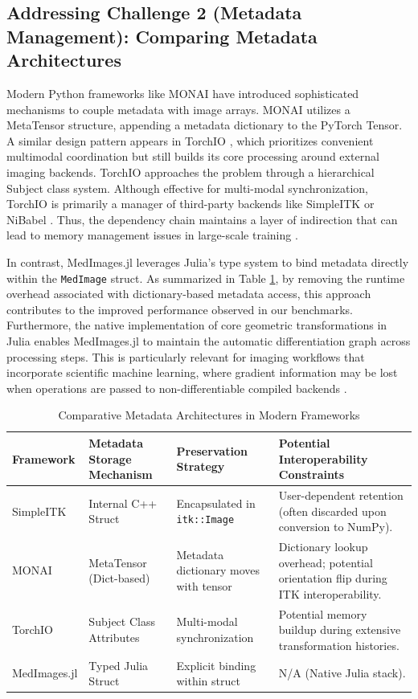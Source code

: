 \documentclass[10pt,letterpaper]{article}
\begin{document}
\subsection*{Addressing Challenge 2 (Metadata Management): Comparing Metadata Architectures}
Modern Python frameworks like MONAI \cite{CardosoLi2022} have introduced sophisticated mechanisms to couple metadata with image arrays. MONAI utilizes a MetaTensor structure, appending a metadata dictionary to the PyTorch Tensor. A similar design pattern appears in TorchIO \cite{perezgarcia2021torchio}, which prioritizes convenient multimodal coordination but still builds its core processing around external imaging backends. TorchIO approaches the problem through a hierarchical Subject class system. Although effective for multi-modal synchronization, TorchIO is primarily a manager of third-party backends  like SimpleITK or NiBabel \cite{perezgarcia2021torchio}. Thus, the dependency chain maintains a layer of indirection that can lead to memory management issues in large-scale training \cite{perezgarcia2021torchio}.

In contrast, MedImages.jl leverages Julia's type system to bind metadata directly within the \texttt{MedImage} struct. As summarized in Table \ref{tab:metadata_comparison}, by removing the runtime overhead associated with dictionary-based metadata access, this approach contributes to the improved performance observed in our benchmarks. Furthermore, the native implementation of core geometric transformations in Julia enables MedImages.jl to maintain the automatic differentiation graph across processing steps. This is particularly relevant for imaging workflows that incorporate scientific machine learning, where gradient information may be lost when operations are passed to non-differentiable compiled backends \cite{perezgarcia2021torchio}. 

\begin{table}[H]
\centering
\caption{Comparative Metadata Architectures in Modern Frameworks}
\begin{tabular}{|p{2.5cm}|p{3.5cm}|p{3.5cm}|p{3.5cm}|}
\hline
\textbf{Framework} & \textbf{Metadata Storage Mechanism} & \textbf{Preservation Strategy} & \textbf{Potential Interoperability Constraints} \\
\hline
SimpleITK & Internal C++ Struct & Encapsulated in \texttt{itk::Image} & User-dependent retention (often discarded upon conversion to NumPy). \\
\hline
MONAI & MetaTensor (Dict-based) & Metadata dictionary moves with tensor & Dictionary lookup overhead; potential orientation flip during ITK interoperability. \\
\hline
TorchIO & Subject Class Attributes & Multi-modal synchronization & Potential memory buildup during extensive transformation histories. \\
\hline
MedImages.jl & Typed Julia Struct & Explicit binding within struct & N/A (Native Julia stack). \\
\hline
\end{tabular}
\label{tab:metadata_comparison}
\end{table}
\end{document}
